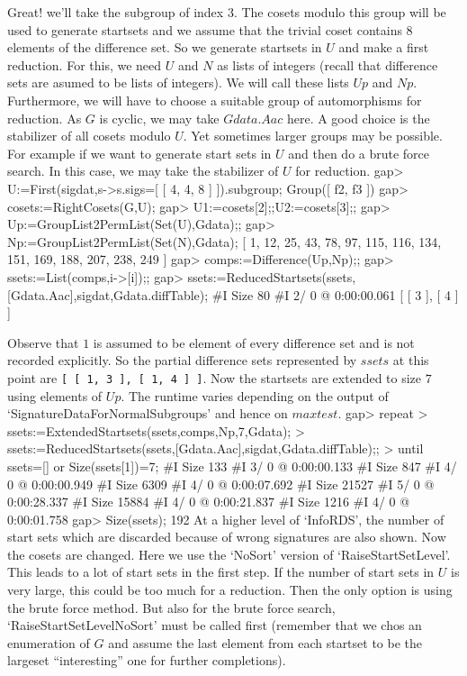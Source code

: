 Great! we'll take the subgroup of index $3$. The cosets modulo this
group will be used to generate startsets and we assume that the
trivial coset contains $8$ elements of the difference set.
So we generate startsets in $U$ and make a first reduction. For this,
we need $U$ and $N$ as lists of integers (recall that difference sets are
asumed to be lists of integers). We will call these lists $Up$ and
$Np$.
Furthermore, we will have to choose a suitable group of automorphisms
for reduction. As $G$ is cyclic, we may take $Gdata.Aac$ here. A good
choice is the stabilizer of all cosets modulo $U$. Yet sometimes
larger groups may be possible. For example if we want to generate
start sets in $U$ and then do a brute force search. In this case, we
may take the stabilizer of $U$ for reduction.
\beginexample
gap> U:=First(sigdat,s->s.sigs=[ [ 4, 4, 8 ] ]).subgroup; 
Group([ f2, f3 ])
gap> cosets:=RightCosets(G,U);
gap> U1:=cosets[2];;U2:=cosets[3];;
gap> Up:=GroupList2PermList(Set(U),Gdata);;  
gap> Np:=GroupList2PermList(Set(N),Gdata); 
[ 1, 12, 25, 43, 78, 97, 115, 116, 134, 151, 169, 188, 207, 238, 249 ]
gap> comps:=Difference(Up,Np);; 
gap> ssets:=List(comps,i->[i]);;
gap> ssets:=ReducedStartsets(ssets,[Gdata.Aac],sigdat,Gdata.diffTable); 
#I  Size 80
#I  2/ 0 @ 0:00:00.061
[ [ 3 ], [ 4 ] ]
\endexample

Observe that $1$ is assumed to be element of every difference set and
is not recorded explicitly. So the partial difference sets represented
by $ssets$ at this point are {\tt[ [ 1, 3 ], [ 1, 4 ] ]}. Now the
startsets are extended to size $7$ using elements of $Up$. The runtime
varies depending on the output of `SignatureDataForNormalSubgroups'
and hence on $maxtest$.
\beginexample
gap> repeat 
>     ssets:=ExtendedStartsets(ssets,comps,Np,7,Gdata); 
>     ssets:=ReducedStartsets(ssets,[Gdata.Aac],sigdat,Gdata.diffTable);; 
> until ssets=[] or Size(ssets[1])=7; 
#I  Size 133
#I  3/ 0 @ 0:00:00.133
#I  Size 847
#I  4/ 0 @ 0:00:00.949
#I  Size 6309
#I  4/ 0 @ 0:00:07.692
#I  Size 21527
#I  5/ 0 @ 0:00:28.337
#I  Size 15884
#I  4/ 0 @ 0:00:21.837
#I  Size 1216
#I  4/ 0 @ 0:00:01.758
gap> Size(ssets);
192
\endexample
At a higher level of `InfoRDS', the number of start sets which are
discarded because of wrong signatures are also shown.
Now the cosets are changed. Here we use the `NoSort' version of
`RaiseStartSetLevel'.  This leads to a lot of start sets in the first
step. If the number of start sets in $U$ is very large, this could be
too much for a reduction. Then the only option is using the brute
force method. But also for the brute force search,
`RaiseStartSetLevelNoSort' must be called first (remember that we chos
an enumeration of $G$ and assume the last element from each startset
to be the largeset ``interesting'' one for further completions).

